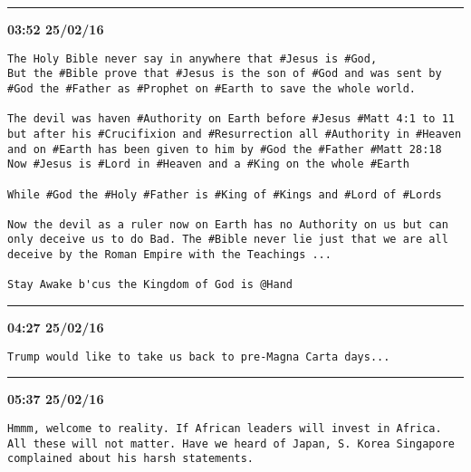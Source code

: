 \hrule%

\begin{adjustwidth}{0cm}{0cm}
\footnotesize \textbf{03:52 25/02/16}

\begin{lstlisting}[breaklines, breakatwhitespace, basicstyle=\small, frame=leftline]
The Holy Bible never say in anywhere that #Jesus is #God,  
But the #Bible prove that #Jesus is the son of #God and was sent by #God the #Father as #Prophet on #Earth to save the whole world. 

The devil was haven #Authority on Earth before #Jesus #Matt 4:1 to 11 but after his #Crucifixion and #Resurrection all #Authority in #Heaven and on #Earth has been given to him by #God the #Father #Matt 28:18  
Now #Jesus is #Lord in #Heaven and a #King on the whole #Earth 

While #God the #Holy #Father is #King of #Kings and #Lord of #Lords 

Now the devil as a ruler now on Earth has no Authority on us but can only deceive us to do Bad. The #Bible never lie just that we are all deceive by the Roman Empire with the Teachings ...

Stay Awake b'cus the Kingdom of God is @Hand
\end{lstlisting}
\end{adjustwidth}

\hrule%

\begin{adjustwidth}{0cm}{0cm}
\footnotesize \textbf{04:27 25/02/16}

\begin{lstlisting}[breaklines, breakatwhitespace, basicstyle=\small, frame=leftline]
Trump would like to take us back to pre-Magna Carta days...
\end{lstlisting}
\end{adjustwidth}

\hrule%

\begin{adjustwidth}{0cm}{0cm}
\footnotesize \textbf{05:37 25/02/16}

\begin{lstlisting}[breaklines, breakatwhitespace, basicstyle=\small, frame=leftline]
Hmmm, welcome to reality. If African leaders will invest in Africa. All these will not matter. Have we heard of Japan, S. Korea Singapore complained about his harsh statements.
\end{lstlisting}
\end{adjustwidth}

